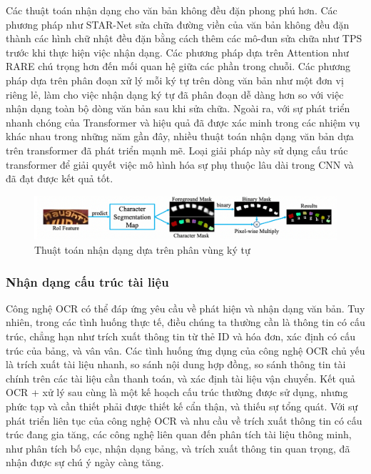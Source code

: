 Các thuật toán nhận dạng cho văn bản không đều đặn phong phú hơn. Các phương pháp như STAR-Net sửa chữa đường viền của văn bản không đều đặn thành các hình chữ nhật đều đặn bằng cách thêm các mô-đun sửa chữa như TPS trước khi thực hiện việc nhận dạng. Các phương pháp dựa trên Attention như RARE chú trọng hơn đến mối quan hệ giữa các phần trong chuỗi. Các phương pháp dựa trên phân đoạn xử lý mỗi ký tự trên dòng văn bản như một đơn vị riêng lẻ, làm cho việc nhận dạng ký tự đã phân đoạn dễ dàng hơn so với việc nhận dạng toàn bộ dòng văn bản sau khi sửa chữa. Ngoài ra, với sự phát triển nhanh chóng của Transformer và hiệu quả đã được xác minh trong các nhiệm vụ khác nhau trong những năm gần đây, nhiều thuật toán nhận dạng văn bản dựa trên transformer đã phát triển mạnh mẽ. Loại giải pháp này sử dụng cấu trúc transformer để giải quyết việc mô hình hóa sự phụ thuộc lâu dài trong CNN và đã đạt được kết quả tốt.

\begin{figure}
    \includegraphics[scale=0.42]{images/recognition-based-charcter-segmentation.png}
    \centering
    \caption{Thuật toán nhận dạng dựa trên phân vùng ký tự}
\end{figure}

\subsubsection{Nhận dạng cấu trúc tài liệu}
Công nghệ OCR có thể đáp ứng yêu cầu về phát hiện và nhận dạng văn bản. Tuy nhiên, trong các tình huống thực tế, điều chúng ta thường cần là thông tin có cấu trúc, chẳng hạn như trích xuất thông tin từ thẻ ID và hóa đơn, xác định có cấu trúc của bảng, và vân vân. Các tình huống ứng dụng của công nghệ OCR chủ yếu là trích xuất tài liệu nhanh, so sánh nội dung hợp đồng, so sánh thông tin tài chính trên các tài liệu cần thanh toán, và xác định tài liệu vận chuyển. Kết quả OCR + xử lý sau cùng là một kế hoạch cấu trúc thường được sử dụng, nhưng phức tạp và cần thiết phải được thiết kế cẩn thận, và thiếu sự tổng quát. Với sự phát triển liên tục của công nghệ OCR và nhu cầu về trích xuất thông tin có cấu trúc đang gia tăng, các công nghệ liên quan đến phân tích tài liệu thông minh, như phân tích bố cục, nhận dạng bảng, và trích xuất thông tin quan trọng, đã nhận được sự chú ý ngày càng tăng.

